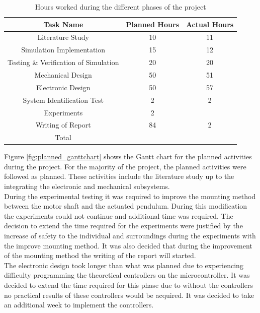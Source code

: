 \begin{table}[h]
	\centering
	\begin{tabular}{|c|c|c|}
		\hline
		Task Name & Planned Hours & Actual Hours \\
		\hline
		\hline
		Literature Study & 10 & 11 \\
		\hline
		Simulation Implementation & 15 & 12 \\
		\hline
		Testing \& Verification of Simulation & 20 & 20 \\
		\hline 
		Mechanical Design  & 50 & 51 \\
		\hline
		Electronic Design & 50 & 57 \\
		\hline
		System Identification Test & 2 & 2 \\
		\hline
		Experiments & 2 & \\
		\hline
		Writing of Report & 84 & 2 \\
		\hline
		\hline
		Total & & \\
		\hline
		
	\end{tabular}
	\caption{Hours worked during the different phases of the project}
	\label{table:hours_worked}
\end{table}

Figure \ref{fig:planned_ganttchart} shows the Gantt chart for the planned activities during the project. For the majority of the project, the planned activities were followed as planned. These activities include the literature study up to the integrating the electronic and mechanical subsystems.\\

During the experimental testing it was required to improve the mounting method between the motor shaft and the actuated pendulum. During this modification the experiments could not continue and additional time was required. The decision to extend the time required for the experiments were justified by the increase of safety to the individual and surroundings during the experiments with the improve mounting method. It was also decided that during the improvement of the mounting method the writing of the report will started.\\	

The electronic design took longer than what was planned due to experiencing difficulty programming the theoretical controllers on the microcontroller. It was decided to extend the time required for this phase due to without the controllers no practical results of these controllers would be acquired. It was decided to take an additional week to implement the controllers.\\

